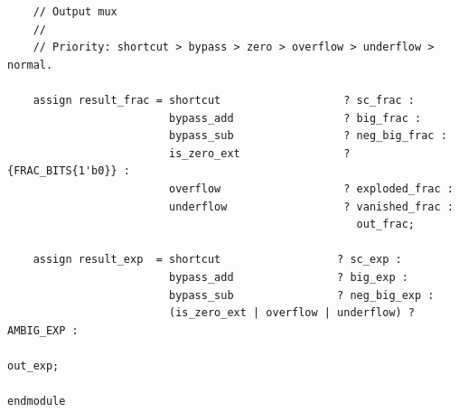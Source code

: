 \documentclass[12pt,letter]{article}
\begin{document}
\begin{lstlisting}
    // Output mux
    //
    // Priority: shortcut > bypass > zero > overflow > underflow > normal.

    assign result_frac = shortcut                   ? sc_frac :
                         bypass_add                 ? big_frac :
                         bypass_sub                 ? neg_big_frac :
                         is_zero_ext                ? {FRAC_BITS{1'b0}} :
                         overflow                   ? exploded_frac :
                         underflow                  ? vanished_frac :
                                                      out_frac;

    assign result_exp  = shortcut                  ? sc_exp :
                         bypass_add                ? big_exp :
                         bypass_sub                ? neg_big_exp :
                         (is_zero_ext | overflow | underflow) ? AMBIG_EXP :
                                                                out_exp;

endmodule
\end{lstlisting}
\end{document}
